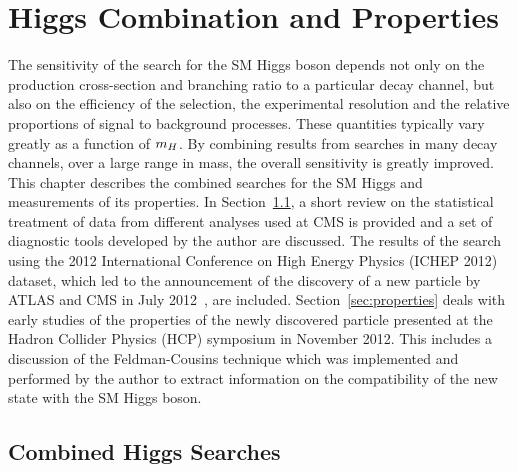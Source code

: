\chapter{Higgs Combination and Properties}
\label{chap:combinations}

The sensitivity 
of the search for the SM Higgs boson depends not only on the production cross-section and 
branching ratio to a particular decay channel, but also on the efficiency
of the selection, the experimental resolution and the relative proportions of 
signal to background processes. These quantities typically vary greatly as a function of 
$m_{H}$. By combining results from searches
in many decay channels, over a large range in mass, 
the overall sensitivity is greatly improved.
This chapter describes the combined searches for the SM Higgs and measurements of its properties. 
In Section~\ref{sec:combinationmethodology}, a short review on the statistical 
treatment of data from different analyses used at CMS is provided and a set of diagnostic
tools developed by the author are discussed.
The results of the search using the 2012 International Conference on
High Energy Physics (ICHEP 2012) dataset, 
which led to the announcement of the discovery of a new particle 
by ATLAS and CMS in July 2012~\citep{HIG-12-028}, are included.
Section~\ref{sec:properties} deals with early studies of the 
properties of the newly discovered particle presented at the Hadron Collider Physics (HCP) 
symposium in November 2012. This includes a discussion of 
the Feldman-Cousins technique which was implemented and performed
by the author to extract information on the compatibility of the new 
state with the SM Higgs boson.

\section{Combined Higgs Searches}
\label{sec:combinationmethodology}

